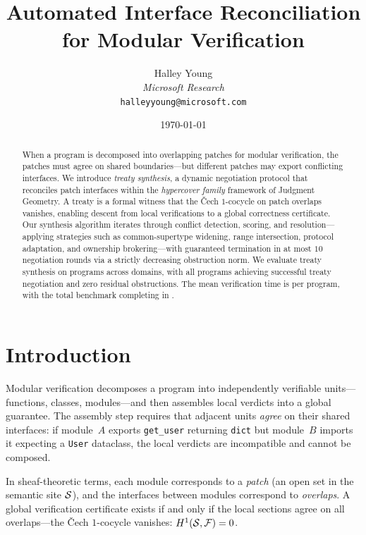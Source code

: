\documentclass[11pt]{article}
\title{\textbf{Automated Interface Reconciliation for Modular Verification}}
\author{%
  Halley Young\\
  \textit{Microsoft Research}\\
  \texttt{halleyyoung@microsoft.com}
}
\date{\today}
\newcommand{\Sect}{\mathcal{F}}             %
\begin{document}
\maketitle

\begin{abstract}
When a program is decomposed into overlapping patches for modular
verification, the patches must agree on shared boundaries---but different
patches may export conflicting interfaces.  We introduce \emph{treaty
synthesis}, a dynamic negotiation protocol that reconciles patch interfaces
within the \emph{hypercover family} framework of Judgment Geometry.  A
treaty is a formal witness that the \v{C}ech $1$-cocycle on patch
overlaps vanishes, enabling descent from local verifications to a global
correctness certificate.  Our synthesis algorithm iterates through
conflict detection, scoring, and resolution---applying strategies such as
common-supertype widening, range intersection, protocol adaptation, and
ownership brokering---with guaranteed termination in at most $10$
negotiation rounds via a strictly decreasing obstruction norm.  We
evaluate treaty synthesis on \expTotalPrograms{} programs across
\expDomainCount{} domains, with all \expVerified{} programs achieving
successful treaty negotiation and zero residual obstructions.  The mean
verification time is \expTimeMean{} per program, with the total
benchmark completing in \expTimeTotal{}.
\end{abstract}

\newpage

\section{Introduction}\label{sec:intro}

Modular verification decomposes a program into independently verifiable
units---functions, classes, modules---and then assembles local verdicts
into a global guarantee.  The assembly step requires that adjacent units
\emph{agree} on their shared interfaces: if module~$A$ exports
\texttt{get\_user} returning \texttt{dict} but module~$B$ imports it
expecting a \texttt{User} dataclass, the local verdicts are incompatible
and cannot be composed.

In sheaf-theoretic terms, each module corresponds to a \emph{patch}
(an open set in the semantic site $\mathcal{S}$), and the interfaces between
modules correspond to \emph{overlaps}.  A global verification certificate
exists if and only if the local sections agree on all overlaps---\ie the
\v{C}ech $1$-cocycle vanishes: $\Hcoh{1}(\Site, \Sect) = 0$.
\end{document}
